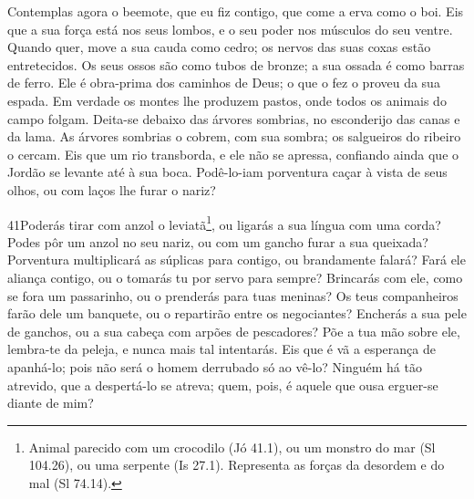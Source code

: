 Contemplas agora o beemote, que eu fiz contigo, que come a erva
como o boi. Eis que a sua força está nos seus lombos, e o seu
poder nos músculos do seu ventre. Quando quer, move a sua
cauda como cedro; os nervos das suas coxas estão entretecidos.
Os seus ossos são como tubos de bronze; a sua ossada é como
barras de ferro. Ele é obra-prima dos caminhos de Deus; o que
o fez o proveu da sua espada. Em verdade os montes lhe
produzem pastos, onde todos os animais do campo folgam.
Deita-se debaixo das árvores sombrias, no esconderijo das
canas e da lama. As árvores sombrias o cobrem, com sua
sombra; os salgueiros do ribeiro o cercam. Eis que um rio
transborda, e ele não se apressa, confiando ainda que o Jordão se
levante até à sua boca. Podê-lo-iam porventura caçar à vista
de seus olhos, ou com laços lhe furar o nariz?

\medskip

\lettrine{41} Poderás tirar com anzol o
leviatã\footnote{Animal parecido com um crocodilo (Jó 41.1), ou um
monstro do mar (Sl 104.26), ou uma serpente (Is 27.1). Representa as
forças da desordem e do mal (Sl 74.14).}, ou ligarás a sua língua
com uma corda? Podes pôr um anzol no seu nariz, ou com um gancho
furar a sua queixada? Porventura multiplicará as súplicas para
contigo, ou brandamente falará? Fará ele aliança contigo, ou o
tomarás tu por servo para sempre? Brincarás com ele, como se
fora um passarinho, ou o prenderás para tuas meninas? Os teus
companheiros farão dele um banquete, ou o repartirão entre os
negociantes? Encherás a sua pele de ganchos, ou a sua cabeça com
arpões de pescadores? Põe a tua mão sobre ele, lembra-te da
peleja, e nunca mais tal intentarás. Eis que é vã a esperança de
apanhá-lo; pois não será o homem derrubado só ao vê-lo?
Ninguém há tão atrevido, que a despertá-lo se atreva; quem,
pois, é aquele que ousa erguer-se diante de mim?

